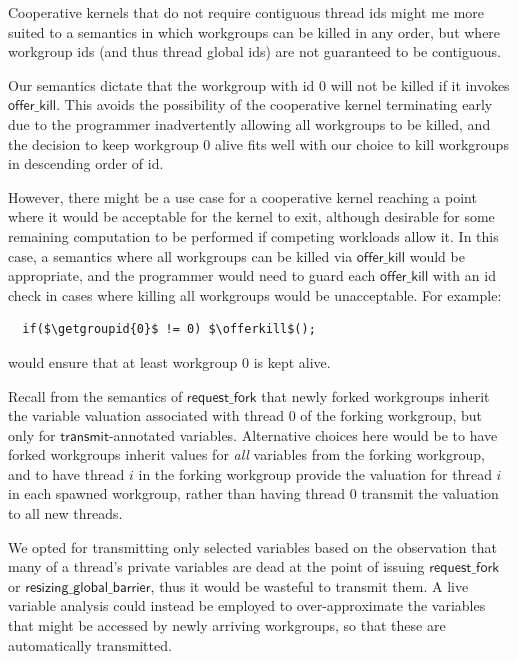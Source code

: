 \documentclass[parskip=half,sigconf,review, anonymous=true, acmcopyrightmode=none]{acmart}
\newcommand{\transmit}{\mathsf{transmit}}
\newcommand{\offerfork}{\mathsf{request\_fork}}
\newcommand{\offerkill}{\mathsf{offer\_kill}}
\newcommand{\resizingglobalbarrier}{\mathsf{resizing\_global\_barrier}}
\newcommand{\getgroupid}{\mathsf{get\_group\_id}}
\begin{document}
Cooperative kernels that do not require contiguous thread ids might me
more suited to a semantics in which workgroups can be killed in any
order, but where workgroup ids (and thus thread global ids) are not
guaranteed to be contiguous.

%
Our semantics dictate that the workgroup with id 0 will not be killed
if it invokes $\offerkill$.  This avoids the possibility of the
cooperative kernel terminating early due to the programmer
inadvertently allowing all workgroups to be killed, and the decision
to keep workgroup 0 alive fits well with our choice to kill workgroups
in descending order of id.

However, there might be a use case for a cooperative kernel reaching a
point where it would be acceptable for the kernel to exit, although
desirable for some remaining computation to be performed if competing
workloads allow it.  In this case, a semantics where all workgroups can be killed via $\offerkill$ would be appropriate, and the programmer would need to guard each $\offerkill$ with an id check in cases where killing all workgroups would be unacceptable.  For example:
%
\lstset{basicstyle=\tt,numbers=none}
\begin{lstlisting}
  if($\getgroupid{0}$ != 0) $\offerkill$();
\end{lstlisting}
\lstset{basicstyle=\scriptsize\tt,numbers=left}
%
would ensure that at least workgroup 0 is kept alive.

%
Recall from the semantics of $\offerfork$ that newly forked workgroups
inherit the variable valuation associated with thread 0 of the forking
workgroup, but only for $\transmit$-annotated variables.  Alternative
choices here would be to have forked workgroups inherit values for
\emph{all} variables from the forking workgroup, and to have thread
$i$ in the forking workgroup provide the valuation for thread $i$ in
each spawned workgroup, rather than having thread 0 transmit the
valuation to all new threads.

We opted for transmitting only selected variables based on the
observation that many of a thread's private variables are dead at the
point of issuing $\offerfork$ or $\resizingglobalbarrier$, thus it
would be wasteful to transmit them.  A live variable analysis could
instead be employed to over-approximate the variables that might be
accessed by newly arriving workgroups, so that these are automatically
transmitted.
\end{document}
